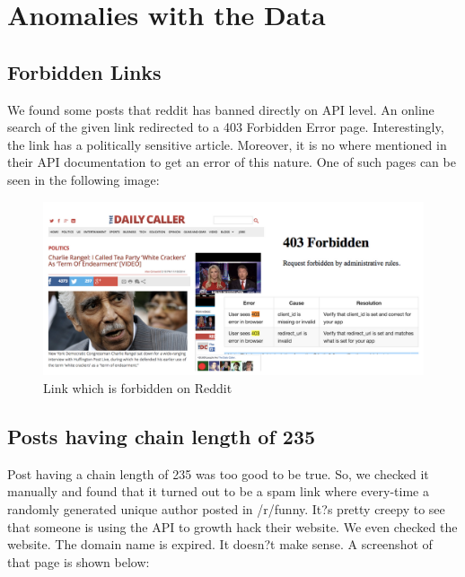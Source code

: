 \documentclass{article} %
\begin{document}
\section{Anomalies with the Data}

\subsection{Forbidden Links}

We found some posts that reddit has banned directly on API level. An online search of the given link redirected to a 403 Forbidden Error page. Interestingly, the link has a politically sensitive article. Moreover, it is no where mentioned in their API documentation to get an error of this nature. One of such pages can be seen in the following image:

\begin{figure}[h]
\begin{center}
\includegraphics[width=5in]{pol.png}
\caption{Link which is forbidden on Reddit}
\end{center}
\end{figure}

\subsection{Posts having chain length of 235}

Post having a chain length of 235 was too good to be true. So, we checked it manually and found that it turned out to be a spam link where every-time a randomly generated unique author posted in /r/funny. It?s pretty creepy to see that someone is using the API to growth hack their website. We even checked the website. The domain name is expired. It doesn?t make sense. A screenshot of that page is shown below:
\end{document}
